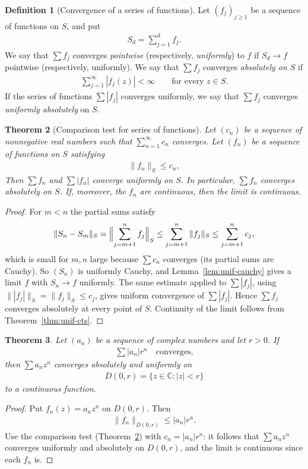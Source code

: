 \documentclass[11pt]{article}
\theoremstyle{plain}
\newtheorem{theorem}{Theorem}[section]
\theoremstyle{definition}
\newtheorem{definition}[theorem]{Definition}
\theoremstyle{remark}
\numberwithin{equation}{section}
\newcommand{\be}{\begin{eqnarray}}
\newcommand{\ee}{\end{eqnarray}}
\newcommand{\C}{\mathbb{C}}
\begin{document}
\begin{definition}[Convergence of a series of functions]
Let $(f_j)_{j\ge1}$ be a sequence of functions on $S$, and put
\be
 S_d=\sum_{j=1}^{d}f_j.
\ee
We say that $\sum f_j$ converges \emph{pointwise} (respectively,
\emph{uniformly}) to $f$ if $S_d\to f$ pointwise (respectively, uniformly).
We say that $\sum f_j$ converges \emph{absolutely on $S$} if
\be
 \sum_{j=1}^{\infty}|f_j(z)|<\infty
 \qquad\text{for every }z\in S.
\ee
If the series of functions $\sum |f_j|$ converges uniformly, we say that
$\sum f_j$ converges \emph{uniformly absolutely} on $S$.
\end{definition}

\begin{theorem}[Comparison test for series of functions]
\label{thm:M-test}
Let $(c_n)$ be a sequence of nonnegative real numbers such that
$\displaystyle\sum_{n=1}^{\infty}c_n$ converges. Let $(f_n)$ be a
sequence of functions on $S$ satisfying
\be
 \|f_n\|_S\le c_n,
\ee
Then $\sum f_n$ and $\sum|f_n|$ converge uniformly on $S$. In particular,
$\sum f_n$ converges absolutely on $S$. If, moreover, the $f_n$ are
continuous, then the limit is continuous.
\end{theorem}

\begin{proof}
For $m<n$ the partial sums satisfy
\be
 \|S_n-S_m\|_S=\Bigl\|\sum_{j=m+1}^{n}f_j\Bigr\|_S
 \le\sum_{j=m+1}^{n}\|f_j\|_S\le\sum_{j=m+1}^{n}c_j,
\ee
which is small for $m,n$ large because $\sum c_n$ converges (its partial
sums are Cauchy). So $(S_n)$ is uniformly Cauchy, and
Lemma~\ref{lem:unif-cauchy} gives a limit $f$ with $S_n\to f$ uniformly.
The same estimate applied to $\sum|f_j|$, using
$\||f_j|\|_S=\|f_j\|_S\le c_j$, gives uniform convergence of
$\sum|f_j|$. Hence $\sum f_j$ converges absolutely at every point of $S$.
Continuity of the limit follows from Theorem~\ref{thm:unif-cts}.
\end{proof}

\begin{theorem}
\label{thm:power-series-disc}
Let $(a_n)$ be a sequence of complex numbers and let $r>0$. If
\be
 \sum|a_n|r^n\quad\text{converges,}
\ee
then $\sum a_nz^n$ converges absolutely and uniformly on
\be
 D(0,r)=\{z\in\C:|z|<r\}
\ee
to a continuous function.
\end{theorem}

\begin{proof}
Put $f_n(z)=a_nz^n$ on $D(0,r)$. Then
\be
 \|f_n\|_{D(0,r)}\le|a_n|r^n.
\ee
Use the comparison test (Theorem~\ref{thm:M-test}) with $c_n=|a_n|r^n$:
it follows that $\sum a_nz^n$ converges uniformly and absolutely on
$D(0,r)$, and the limit is continuous since each $f_n$ is.
\end{proof}
\end{document}
